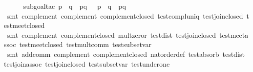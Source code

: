 \begin{isabellebody}
%
\isadelimproof
\ \ \ \ %
\endisadelimproof
%
\isatagproof
{}\isamarkupfalse%
\ {}subgoal{}tac\ {}p\ {}\ q\ {}\ {}p{}{}q\ {}\ {}{}\ {}{}p\ {}\ q{}\ {}\ {}{}p{}{}q{}\ {}\ {}{}{}\isanewline
\ \ \ \ \isamarkupfalse%
\ {}smt\ complement{}\ complement{}\ complement{}closed\ test{}compl{}uniq\ test{}join{}closed\ test{}meet{}closed{}\isanewline
\ \ \ \ \isamarkupfalse%
\ {}smt\ complement{}\ complement{}closed\ mult{}zeror\ test{}dist{}\ test{}join{}closed\ test{}meet{}assoc\ test{}meet{}closed\ test{}mult{}comm\ test{}subset{}var{}\isanewline
\ \ \ \ \isamarkupfalse%
\ {}smt\ add{}comm\ complement{}\ complement{}closed\ nat{}order{}def\ test{}absorb{}\ test{}dist{}\ test{}join{}assoc\ test{}join{}closed\ test{}subset{}var\ test{}under{}one{}%

\end{isabellebody}
